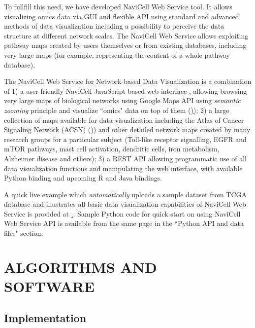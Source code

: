 \documentclass[a4,center,fleqn]{NAR}
\begin{document}
To fullfill this need, we have developed NaviCell Web Service tool. It allows
visualizing omics data via GUI and flexible API using standard and advanced
methods of data visualization including a possibility to perceive the data
structure at different network scales. The NaviCell Web Service allows
exploiting pathway maps created by users themselves or from existing databases,
including very large maps (for example, representing the content of a whole
pathway database).


\enlargethispage{-65.1pt}





The NaviCell Web Service for Network-based Data
Visualization is a combination of 1) a user-friendly NaviCell JavaScript-based
web interface \cite{kuperstein2013navicell}, allowing browsing very large maps
of biological networks using Google Maps API using \emph{semantic zooming}
principle and visualize ``omics" data on top of them
(\href{https://navicell.curie.fr})); 2) a large collection of maps available for
data visualization including the Atlas of Cancer Signaling Network (ACSN)
(\href{https://acsn.curie.fr}))  and other detailed network maps created by many
research groups for a particular subject (Toll-like receptor signalling, EGFR
and mTOR pathways, mast cell activation, dendritic cells, iron metabolism,
Alzheimer disease and others); 3) a REST API allowing programmatic use of all
data visualization functions and manipulating the web interface, with available
Python binding and upcoming R and Java bindings.

A quick live example which \emph{automatically} uploads a sample dataset from
TCGA database and illustrates all basic data visualization capabilities of
NaviCell Web Service is provided at
\href{http://navicell.curie.fr/pages/nav\_web\_service.html}.. Sample Python
code for quick start on using NaviCell Web Service API is available from the
same page in the ``Python API and data files" section.

\section{ALGORITHMS AND SOFTWARE}

\subsection{Implementation}
\end{document}
